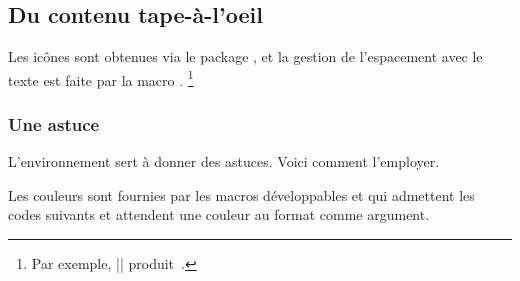 \documentclass[10pt, a4paper]{article}
\begin{document}
\subsection{Du contenu tape-à-l'oeil}  \label{tdoc-colorful-focus}

\begin{tdocnote}
    Les icônes sont obtenues via le package , et la gestion de l'espacement avec le texte est faite par la macro .
    \footnote{
        Par exemple,
        \tdocinlatex||
        produit\,
        .
    }
\end{tdocnote}


\subsubsection{Une astuce}

L'environnement  sert à donner des astuces. Voici comment l'employer.



\smallskip

\begin{tdocnote}
    Les couleurs sont fournies par les macros développables  et  qui admettent les codes suivants et attendent une couleur au format  comme argument.

    \begin{tdoclatex}[code]
    \end{tdoclatex}
\end{tdocnote}
\end{document}
